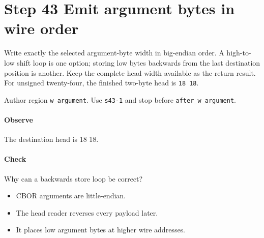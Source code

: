 \section{Step 43 Emit argument bytes in wire order}\label{cbor-s43}
Write exactly the selected argument-byte width in big-endian order. A high-to-low shift loop is one option; storing low bytes backwards from the last destination position is another. Keep the complete head width available as the return result. For unsigned twenty-four, the finished two-byte head is \texttt{18 18}.

Author region \texttt{w\_argument}. Use \texttt{s43-1} and stop before \texttt{after\_w\_argument}.

\paragraph{Observe} The destination head is 18 18.

\paragraph{Check} Why can a backwards store loop be correct?
\begin{itemize}
  \item[A.] CBOR arguments are little-endian.
  \item[B.] The head reader reverses every payload later.
  \item[C.] It places low argument bytes at higher wire addresses.
\end{itemize}
